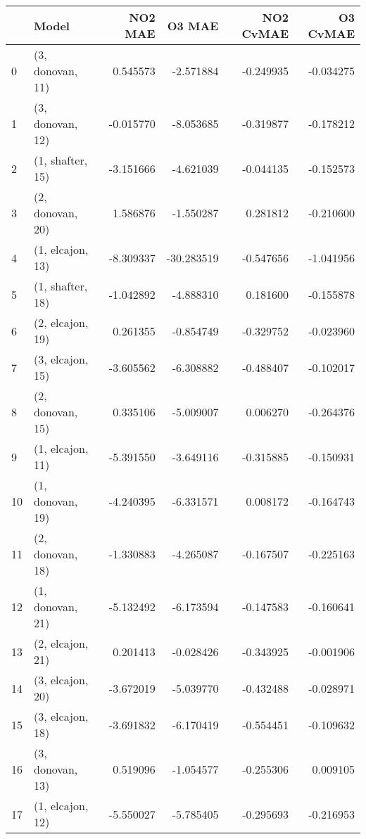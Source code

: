 \begin{tabular}{llrrrr}
\toprule
{} &             Model &   NO2 MAE &     O3 MAE &  NO2 CvMAE &  O3 CvMAE \\
\midrule
0  &  (3, donovan, 11) &  0.545573 &  -2.571884 &  -0.249935 & -0.034275 \\
1  &  (3, donovan, 12) & -0.015770 &  -8.053685 &  -0.319877 & -0.178212 \\
2  &  (1, shafter, 15) & -3.151666 &  -4.621039 &  -0.044135 & -0.152573 \\
3  &  (2, donovan, 20) &  1.586876 &  -1.550287 &   0.281812 & -0.210600 \\
4  &  (1, elcajon, 13) & -8.309337 & -30.283519 &  -0.547656 & -1.041956 \\
5  &  (1, shafter, 18) & -1.042892 &  -4.888310 &   0.181600 & -0.155878 \\
6  &  (2, elcajon, 19) &  0.261355 &  -0.854749 &  -0.329752 & -0.023960 \\
7  &  (3, elcajon, 15) & -3.605562 &  -6.308882 &  -0.488407 & -0.102017 \\
8  &  (2, donovan, 15) &  0.335106 &  -5.009007 &   0.006270 & -0.264376 \\
9  &  (1, elcajon, 11) & -5.391550 &  -3.649116 &  -0.315885 & -0.150931 \\
10 &  (1, donovan, 19) & -4.240395 &  -6.331571 &   0.008172 & -0.164743 \\
11 &  (2, donovan, 18) & -1.330883 &  -4.265087 &  -0.167507 & -0.225163 \\
12 &  (1, donovan, 21) & -5.132492 &  -6.173594 &  -0.147583 & -0.160641 \\
13 &  (2, elcajon, 21) &  0.201413 &  -0.028426 &  -0.343925 & -0.001906 \\
14 &  (3, elcajon, 20) & -3.672019 &  -5.039770 &  -0.432488 & -0.028971 \\
15 &  (3, elcajon, 18) & -3.691832 &  -6.170419 &  -0.554451 & -0.109632 \\
16 &  (3, donovan, 13) &  0.519096 &  -1.054577 &  -0.255306 &  0.009105 \\
17 &  (1, elcajon, 12) & -5.550027 &  -5.785405 &  -0.295693 & -0.216953 \\
\bottomrule
\end{tabular}
